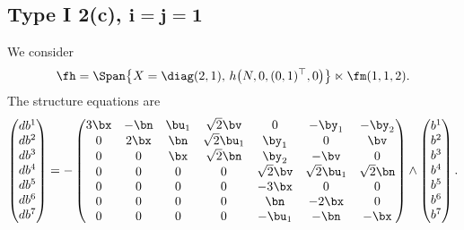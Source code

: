 \subsection[Type I 2(c), $i=j=1$]{Type I 2(c), $\boldsymbol{i=j=1}$}
We consider
\begin{gather*}\fh=\Span\big\{X=\diag(2,1), \, h\big(N,0,(0,1)^\top,0\big) \big\}\ltimes\fm(1,1,2).\end{gather*}
The structure equations are
\begin{gather}\label{EI2(c)ij=1}\left(\begin{matrix} db^1\\db^2\\db^3\\db^4\\db^5\\db^6\\db^7\end{matrix}\right) = -\left(
\begin{matrix}
3{\bx} &-\bn&\bu_1&\sqrt2 \bv&0&-\by_1&-\by_2\\
0&2\bx&\bn&\sqrt2 \bu_1&\by_1&0&\bv\\
0&0&\bx&\sqrt 2 \bn&\by_2&-\bv&0\\
0&0&0&0&\sqrt2 \bv&\sqrt2 \bu_1&\sqrt 2 \bn\\
0&0&0&0&-3\bx&0&0\\
0&0&0&0&\bn&-2\bx&0\\
0&0&0&0&-\bu_1&-\bn&-\bx
\end{matrix}\right) \wedge \left(\begin{matrix} b^1\\b^2\\b^3\\b^4\\b^5\\b^6\\b^7\end{matrix}\right).
\end{gather}
